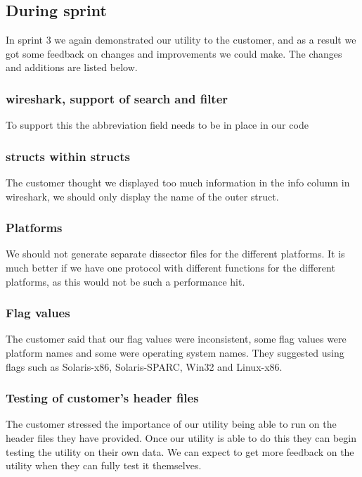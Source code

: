 \subsection{During sprint}

In sprint 3 we again demonstrated our \gls{utility} to the customer, and as a result we got some feedback on changes
and improvements we could make. The changes and additions are listed below.

\subsubsection{\Gls{wireshark}, support of search and filter}

To support this the abbreviation field needs to be in place in our code

\subsubsection{\Glspl{struct} within \glspl{struct}}

The customer thought we displayed too much information in the info column in \Gls{wireshark},
 we should only display the name of the outer \gls{struct}.

\subsubsection{Platforms}

We should not generate separate \gls{dissector} files for the different platforms. It is much better if we have one \gls{protocol}
with different functions for the different platforms, as this would not be such a performance hit.

\subsubsection{Flag values}

The customer said that our flag values were inconsistent, some flag values were platform names and some were operating
system names. They suggested using flags such as Solaris-x86, Solaris-SPARC, Win32 and Linux-x86.

\subsubsection{Testing of customer's \gls{header} files}

The customer stressed the importance of our \gls{utility} being able to run on the \gls{header} files they have provided.
Once our \gls{utility} is able to do this they can begin testing the \gls{utility} on their own data.
We can expect to get more feedback on the \gls{utility} when they can fully test it themselves.


